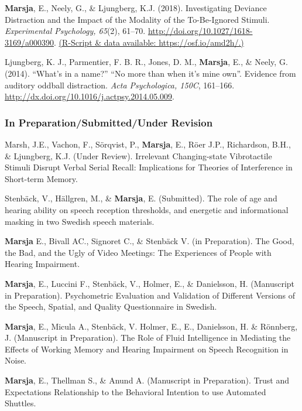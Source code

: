 \documentclass[]{article}
\begin{document}
\textbf{Marsja}, E., Neely, G., \& Ljungberg, K.J. (2018). Investigating
Deviance Distraction and the Impact of the Modality of the To-Be-Ignored
Stimuli. \emph{Experimental Psychology, 65}(2), 61--70.
\url{http://doi.org/10.1027/1618-3169/a000390}.
\href{https://osf.io/amd2h/}{(R-Script \& data available:
https://osf.io/amd2h/.)}

Ljungberg, K. J., Parmentier, F. B. R., Jones, D. M., \textbf{Marsja},
E., \& Neely, G. (2014). ``What's in a name?'' ``No more than when it's
mine own''. Evidence from auditory oddball distraction. \emph{Acta
Psychologica, 150C}, 161--166.
\href{http://doi.org/10.1027/1618-3169/a000390}{http://dx.doi.org/10.1016/j.actpsy.2014.05.009}.

\hypertarget{in-preparationsubmittedunder-revision}{%
\subsubsection{In Preparation/Submitted/Under
Revision}\label{in-preparationsubmittedunder-revision}}

Marsh, J.E., Vachon, F., Sörqvist, P., \textbf{Marsja}, E., Röer J.P.,
Richardson, B.H., \& Ljungberg, K.J. (Under Review). Irrelevant
Changing-state Vibrotactile Stimuli Disrupt Verbal Serial Recall:
Implications for Theories of Interference in Short-term Memory.

Stenbäck, V., Hällgren, M., \& \textbf{Marsja}, E. (Submitted). The role
of age and hearing ability on speech reception thresholds, and energetic
and informational masking in two Swedish speech materials.

\textbf{Marsja} E., Bivall AC., Signoret C., \& Stenbäck V. (in
Preparation). The Good, the Bad, and the Ugly of Video Meetings: The
Experiences of People with Hearing Impairment.

\textbf{Marsja}, E., Luccini F., Stenbäck, V., Holmer, E., \&
Danielsson, H. (Manuscript in Preparation). Psychometric Evaluation and
Validation of Different Versions of the Speech, Spatial, and Quality
Questionnaire in Swedish.

\textbf{Marsja}, E., Micula A., Stenbäck, V. Holmer, E., E., Danielsson,
H. \& Rönnberg, J. (Manuscript in Preparation). The Role of Fluid
Intelligence in Mediating the Effects of Working Memory and Hearing
Impairment on Speech Recognition in Noise.

\textbf{Marsja}, E., Thellman S., \& Anund A. (Manuscript in
Preparation). Trust and Expectations Relationship to the Behavioral
Intention to use Automated Shuttles.
\end{document}
